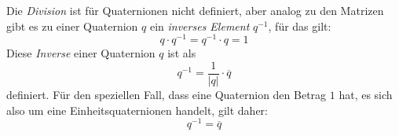 Die \emph{Division} ist für Quaternionen nicht definiert, aber analog zu den Matrizen gibt es zu einer Quaternion $q$ ein \emph{inverses Element} $q^{-1}$, für das gilt:
\begin{equation}
 q \cdot q^{-1} = q^{-1} \cdot q = 1
\end{equation}
Diese \emph{Inverse} einer Quaternion $q$ ist als
\begin{equation}
 q^{-1} = \frac{1}{\left| q \right|} \cdot \overline{q}
\end{equation}
definiert. Für den speziellen Fall, dass eine Quaternion den Betrag $1$ hat, es sich also um eine Einheitsquaternionen handelt, gilt daher:
\begin{equation}
 q^{-1} = \overline{q}
\end{equation}
